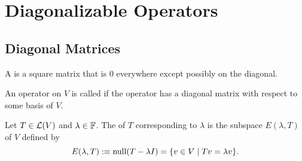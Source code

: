 \clearpage
\section{Diagonalizable Operators}
\subsection{Diagonal Matrices}

\setcounter{thm}{47}
\begin{mydef} 
  A  is a square matrix that is $0$ everywhere except possibly on \nopagebreak the diagonal.
\end{mydef}

\setcounter{thm}{49}
\begin{mydef} [diagonalizable]
  An operator on $V$ is called  if the operator has a diagonal matrix with respect to some basis of $V$.
\end{mydef}

\setcounter{thm}{51}
\label{eigenspace}
\begin{mydef} 
  Let $T \in \mathcal{L}(V)$ and $\lambda \in \mathbb{F}$. The  of $T$ corresponding to $\lambda$ is the subspace $E(\lambda, T)$ of $V$ defined by
  \begin{equation}
    E(\lambda, T) :\equiv  \operatorname{null}(T-\lambda I) = \{ v\in V \mid Tv = \lambda v\}.
  \end{equation}
\end{mydef}

